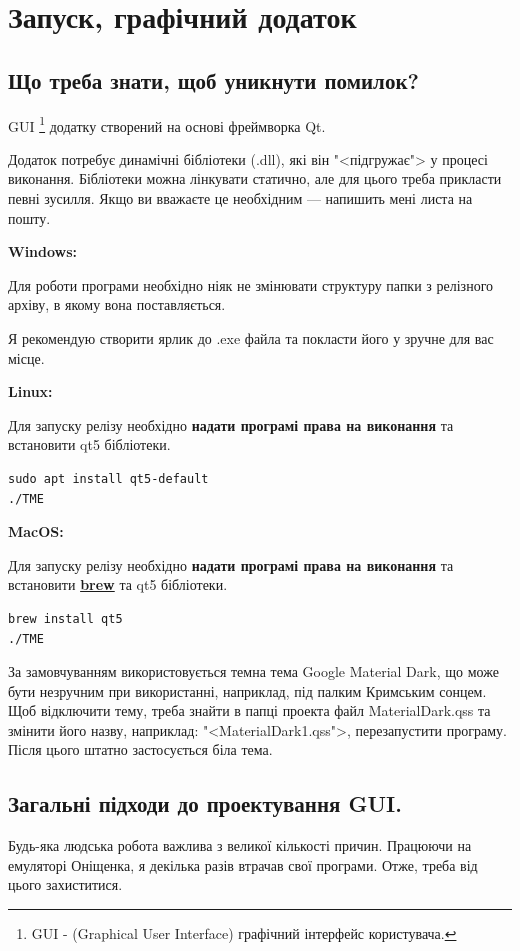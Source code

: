 \documentclass[oneside,final,14pt]{extreport}
\begin{document}
\chapter{Запуск, графічний додаток}
\section{Що треба знати, щоб уникнути помилок?}
GUI
\footnote{GUI - (Graphical User Interface) графічний інтерфейс користувача.}
 додатку створений на основі фреймворка Qt.

Додаток потребує динамічні бібліотеки (.dll), які він "<підгружає"> у процесі виконання. 
Бібліотеки можна лінкувати статично, але для цього треба прикласти певні зусилля. Якщо ви вважаєте це необхідним --- напишить мені листа на пошту.

\textbf{Windows:}

Для роботи програми необхідно ніяк не змінювати структуру папки з релізного архіву, в якому вона поставляється.

Я рекомендую створити ярлик до .exe файла та покласти його у зручне для вас місце.

\textbf{Linux:}

Для запуску релізу необхідно \textbf{надати програмі права на виконання} та встановити qt5 бібліотеки.
\begin{tcolorbox}	
\begin{verbatim}
sudo apt install qt5-default
./TME
\end{verbatim}
\end{tcolorbox}

\textbf{MacOS:}

Для запуску релізу необхідно \textbf{надати програмі права на виконання} та встановити \textbf{\href{https://brew.sh}{brew}} та qt5 бібліотеки.
\begin{tcolorbox}	
\begin{verbatim}
brew install qt5
./TME
\end{verbatim}
\end{tcolorbox}
		
За замовчуванням використовується темна тема Google Material Dark, що може бути незручним при використанні, наприклад, під палким Кримським сонцем. Щоб відключити тему, треба знайти в папці проекта файл MaterialDark.qss та змінити його назву, наприклад: "<MaterialDark1.qss">, перезапустити програму. Після цього штатно застосується біла тема.

\section{Загальні підходи до проектування GUI.}
Будь-яка людська робота важлива з великої кількості причин. Працюючи на емуляторі Оніщенка, я декілька разів втрачав свої програми. Отже, треба від цього захиститися.
		
\end{document}
